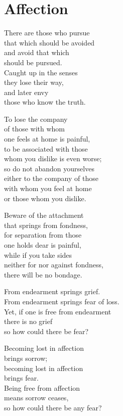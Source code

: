 
\chapter{Affection}


There are those who pursue\\
that which should be avoided\\
and avoid that which\\
should be pursued.\\
Caught up in the senses\\
they lose their way,\\
and later envy\\
those who know the truth.


To lose the company\\
of those with whom\\
one feels at home is painful,\\
to be associated with those\\
whom you dislike is even worse;\\
so do not abandon yourselves\\
either to the company of those\\
with whom you feel at home\\
or those whom you dislike.


Beware of the attachment\\
that springs from fondness,\\
for separation from those\\
one holds dear is painful,\\
while if you take sides\\
neither for nor against fondness,\\
there will be no bondage.


From endearment springs grief.\\
From endearment springs fear of loss.\\
Yet, if one is free from endearment\\
there is no grief\\
so how could there be fear?


Becoming lost in affection\\
brings sorrow;\\
becoming lost in affection\\
brings fear.\\
Being free from affection\\
means sorrow ceases,\\
so how could there be any fear?



